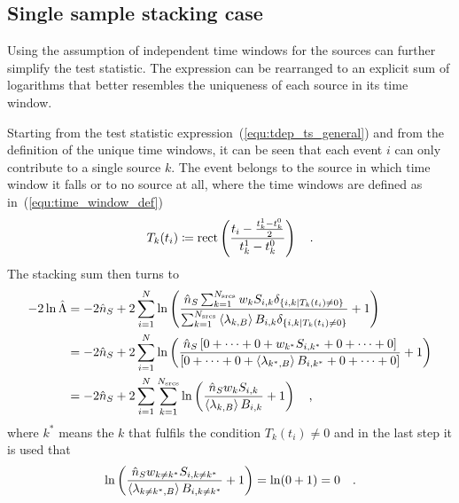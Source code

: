 \subsection{Single sample stacking case}
  \label{chp:pointsource_tdep_llh_single}
Using the assumption of independent time windows for the sources can further simplify the test statistic.
The expression can be rearranged to an explicit sum of logarithms that better resembles the uniqueness of each source in its time window.

Starting from the test statistic expression~(\ref{equ:tdep_ts_general}) and from the definition of the unique time windows, it can be seen that each event $i$ can only contribute to a single source $k$.
The event belongs to the source in which time window it falls or to no source at all, where the time windows are defined as in~(\ref{equ:time_window_def})
\begin{equation}
  T_k(t_i) \coloneqq \operatorname{rect} \left(
    \frac{t_i - \frac{t_k^1-t_k^0}{2}} {t_k^1-t_k^0}
  \right)
  \quad\text{.}
\end{equation}
The stacking sum then turns to
\begin{align}
  -2\ln\hat{\Lambda}
  &= -2\hat{n}_S +
      2\sum_{i=1}^N \ln\left(
        \frac{\hat{n}_S \sum_{k=1}^{N_\text{srcs}} w_k S_{i,k}
              \delta_{\{i,k|T_k(t_i)\neq 0\}}}
             {\sum_{k=1}^{N_\text{srcs}}\Braket{\lambda_{k,B}} B_{i,k}
              \delta_{\{i,k|T_k(t_i)\neq 0\}}}
        + 1
      \right) \\
  &= -2\hat{n}_S +
      2\sum_{i=1}^N \ln\left(
        \frac{\hat{n}_S \left[0+\dots+0+ w_{k^*} S_{i,k^*} +0+\dots+0\right]}
             {\left[
              0+\dots+0+ \Braket{\lambda_{k^*,B}} B_{i,k^*} +0+\dots+0
              \right]}
        + 1
      \right) \\
  &= -2\hat{n}_S +
      2\sum_{i=1}^N \sum_{k=1}^{N_\text{srcs}} \ln\left(
        \frac{\hat{n}_S w_k S_{i,k}}{\Braket{\lambda_{k,B}} B_{i,k}}
        + 1
      \right)
  \quad\text{,}
\end{align}
where $k^*$ means the $k$ that fulfils the condition $T_k(t_i)\neq 0$ and in the last step it is used that
\begin{equation}
  \ln\left(
      \frac{\hat{n}_S w_{k\neq k^*} S_{i,k\neq k^*}}
           {\Braket{\lambda_{k\neq k^*,B}} B_{i,k\neq k^*}}
      + 1
    \right)
    = \ln(0 + 1) = 0
  \quad\text{.}
\end{equation}

